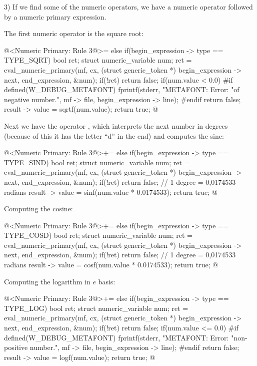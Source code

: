 3) If we find some of the numeric operators, we have a numeric
operator followed by a numeric primary expression.

The first numeric operator is the square root:

\iniciocodigo
@<Numeric Primary: Rule 3@>=
else if(begin_expression -> type == TYPE_SQRT){
  bool ret;
  struct numeric_variable num;
  ret = eval_numeric_primary(mf, cx, (struct generic_token *)
                             begin_expression -> next,
                             end_expression, &num);
  if(!ret)
    return false;
  if(num.value < 0.0){
#if defined(W_DEBUG_METAFONT)
    fprintf(stderr, "METAFONT: Error: %
            "of negative number.\n", mf -> file,
            begin_expression -> line);
#endif
    return false;
  }
  result -> value = sqrtf(num.value);
  return true;  
}
@
\fimcodigo

Next we have the operator , which interprets the next
number in degrees (because of this it has the letter ``d'' in the end)
and computes the sine:

\iniciocodigo
@<Numeric Primary: Rule 3@>+=
else if(begin_expression -> type == TYPE_SIND){
  bool ret;
  struct numeric_variable num;
  ret = eval_numeric_primary(mf, cx, (struct generic_token *)
                             begin_expression -> next,
                             end_expression, &num);
  if(!ret)
    return false;
  // 1 degree = 0,0174533 radians
  result -> value = sinf(num.value * 0.0174533);
  return true;  
}
@
\fimcodigo

Computing the cosine:

\iniciocodigo
@<Numeric Primary: Rule 3@>+=
else if(begin_expression -> type == TYPE_COSD){
  bool ret;
  struct numeric_variable num;
  ret = eval_numeric_primary(mf, cx, (struct generic_token *)
                             begin_expression -> next,
                             end_expression, &num);
  if(!ret)
    return false;
  // 1 degree = 0,0174533 radians
  result -> value = cosf(num.value * 0.0174533);
  return true;
}
@
\fimcodigo

Computing the logarithm in $e$ basis:

\iniciocodigo
@<Numeric Primary: Rule 3@>+=
else if(begin_expression -> type == TYPE_LOG){
  bool ret;
  struct numeric_variable num;
  ret = eval_numeric_primary(mf, cx, (struct generic_token *)
                             begin_expression -> next,
                             end_expression, &num);
  if(!ret)
    return false;
  if(num.value <= 0.0){
#if defined(W_DEBUG_METAFONT)
    fprintf(stderr, "METAFONT: Error: %
            "non-positive number.\n", mf -> file,
            begin_expression -> line);
#endif
    return false;
  }    
  result -> value = logf(num.value);
  return true;  
}
@
\fimcodigo

